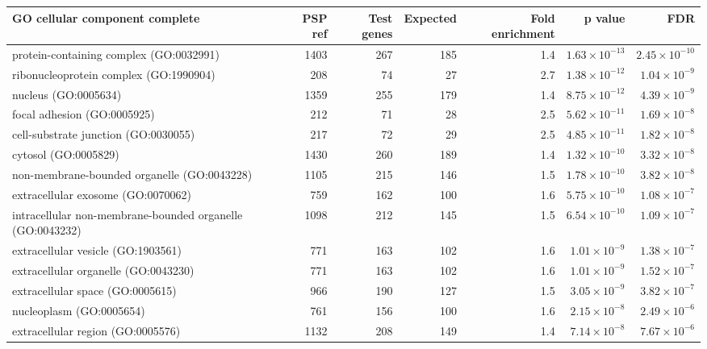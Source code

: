 \begin{table}[ht]
\centering
\begin{adjustbox}{width=\textwidth}

\begin{tabular}{lrrrrrr}
  \hline
GO cellular component complete & PSP ref & Test genes & Expected & Fold enrichment & p value & FDR \\ 
  \hline
protein-containing complex (GO:0032991) & 1403 & 267 & 185 & 1.4 & $1.63 \times 10^{-13}$ & $2.45 \times 10^{-10}$ \\ 
  ribonucleoprotein complex (GO:1990904) & 208 & 74 & 27 & 2.7 & $1.38 \times 10^{-12}$ & $1.04 \times 10^{-9}$ \\ 
  nucleus (GO:0005634) & 1359 & 255 & 179 & 1.4 & $8.75 \times 10^{-12}$ & $4.39 \times 10^{-9}$ \\ 
  focal adhesion (GO:0005925) & 212 & 71 & 28 & 2.5 & $5.62 \times 10^{-11}$ & $1.69 \times 10^{-8}$ \\ 
  cell-substrate junction (GO:0030055) & 217 & 72 & 29 & 2.5 & $4.85 \times 10^{-11}$ & $1.82 \times 10^{-8}$ \\ 
  cytosol (GO:0005829) & 1430 & 260 & 189 & 1.4 & $1.32 \times 10^{-10}$ & $3.32 \times 10^{-8}$ \\ 
  non-membrane-bounded organelle (GO:0043228) & 1105 & 215 & 146 & 1.5 & $1.78 \times 10^{-10}$ & $3.82 \times 10^{-8}$ \\ 
  extracellular exosome (GO:0070062) & 759 & 162 & 100 & 1.6 & $5.75 \times 10^{-10}$ & $1.08 \times 10^{-7}$ \\ 
  intracellular non-membrane-bounded organelle (GO:0043232) & 1098 & 212 & 145 & 1.5 & $6.54 \times 10^{-10}$ & $1.09 \times 10^{-7}$ \\ 
  extracellular vesicle (GO:1903561) & 771 & 163 & 102 & 1.6 & $1.01 \times 10^{-9}$ & $1.38 \times 10^{-7}$ \\ 
  extracellular organelle (GO:0043230) & 771 & 163 & 102 & 1.6 & $1.01 \times 10^{-9}$ & $1.52 \times 10^{-7}$ \\ 
  extracellular space (GO:0005615) & 966 & 190 & 127 & 1.5 & $3.05 \times 10^{-9}$ & $3.82 \times 10^{-7}$ \\ 
  nucleoplasm (GO:0005654) & 761 & 156 & 100 & 1.6 & $2.15 \times 10^{-8}$ & $2.49 \times 10^{-6}$ \\ 
  extracellular region (GO:0005576) & 1132 & 208 & 149 & 1.4 & $7.14 \times 10^{-8}$ & $7.67 \times 10^{-6}$ \\ 

\end{tabular}
\end{adjustbox}
\end{table}
